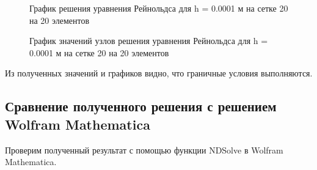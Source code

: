 \documentclass[12pt, a4paper]{article}
\begin{document}
\begin{figure}[!htbp]
	\caption{График решения уравнения Рейнольдса для h = 0.0001 м на сетке 20 на 20 элементов}
	\label{20x20mesh}
\end{figure}
\begin{figure}[!htbp]
	\caption{График значений узлов решения уравнения Рейнольдса для h = 0.0001 м на сетке 20 на 20 элементов}
	\label{20x20points}
\end{figure}

Из полученных значений и графиков видно, что граничные условия выполняются.

\subsection{Сравнение полученного решения с решением Wolfram Mathematica}

Проверим полученный результат с помощью функции NDSolve в Wolfram Mathematica.
\end{document}
